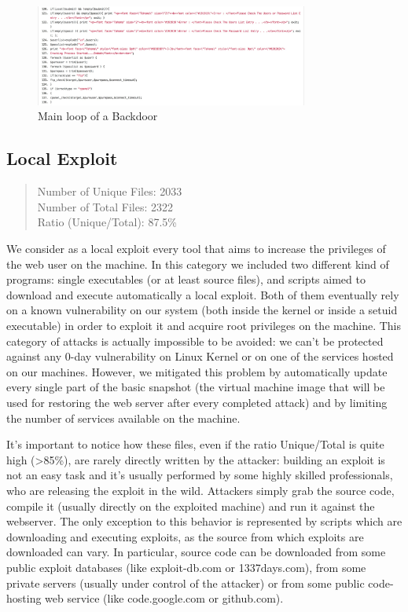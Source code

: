 \begin{figure}[H]
\centerline{\includegraphics[width=0.8\textwidth]{Images/bruteForcer.jpg}}
\caption{Main loop of a Backdoor\label{fig:bruteForcer}}
\end{figure}

\subsection{Local Exploit}

\begin{quote}
Number of Unique Files: 2033\\
Number of Total Files: 2322\\
Ratio (Unique/Total): 87.5\%
\end{quote}

We consider as a local exploit every tool that aims to increase the privileges of the web user on the machine. In this category we included two different kind of programs: single executables (or at least source files), and scripts aimed to download and execute automatically a local exploit. Both of them eventually rely on a known vulnerability on our system (both inside the kernel or inside a setuid executable) in order to exploit it and acquire root privileges on the machine.
This category of attacks is actually impossible to be avoided: we can't be protected against any 0-day vulnerability on Linux Kernel or on one of the services hosted on our machines. However, we mitigated this problem by automatically update every single part of the basic snapshot (the virtual machine image that will be used for restoring the web server after every completed attack) and by limiting the number of services available on the machine.

It's important to notice how these files, even if the ratio Unique/Total is quite high (>85\%), are rarely directly written by the attacker: building an exploit is not an easy task and it's usually performed by some highly skilled professionals, who are releasing the exploit in the wild. Attackers simply grab the source code, compile it (usually directly on the exploited machine) and run it against the webserver. The only exception to this behavior is represented by scripts which are downloading and executing exploits, as the source from which exploits are downloaded can vary. In particular, source code can be downloaded from some public exploit databases (like exploit-db.com or 1337days.com), from some private servers (usually under control of the attacker) or from some public code-hosting web service (like code.google.com or github.com).

